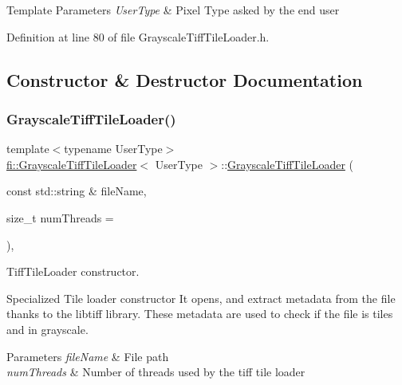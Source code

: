 \begin{DoxyTemplParams}{Template Parameters}
{\em User\+Type} & Pixel Type asked by the end user \\
\hline
\end{DoxyTemplParams}


Definition at line 80 of file Grayscale\+Tiff\+Tile\+Loader.\+h.



\subsection{Constructor \& Destructor Documentation}
\mbox{\label{classfi_1_1GrayscaleTiffTileLoader_ab2126146a3943c3ec2bd3004b01212c9}} 
\subsubsection{\texorpdfstring{Grayscale\+Tiff\+Tile\+Loader()}{GrayscaleTiffTileLoader()}\hspace{0.1cm}{\footnotesize\ttfamily [1/2]}}
{\footnotesize\ttfamily template$<$typename User\+Type$>$ \\
\hyperlink{classfi_1_1GrayscaleTiffTileLoader}{fi\+::\+Grayscale\+Tiff\+Tile\+Loader}$<$ User\+Type $>$\+::\hyperlink{classfi_1_1GrayscaleTiffTileLoader}{Grayscale\+Tiff\+Tile\+Loader} (\begin{DoxyParamCaption}\item[{const std\+::string \&}]{file\+Name,  }\item[{size\+\_\+t}]{num\+Threads = {} }\end{DoxyParamCaption})\hspace{0.3cm}{\ttfamily [inline]}, {\ttfamily [explicit]}}



Tiff\+Tile\+Loader constructor. 

Specialized Tile loader constructor It opens, and extract metadata from the file thanks to the libtiff library. These metadata are used to check if the file is tiles and in grayscale. 
\begin{DoxyParams}{Parameters}
{\em file\+Name} & File path \\
\hline
{\em num\+Threads} & Number of threads used by the tiff tile loader \\
\hline
\end{DoxyParams}


